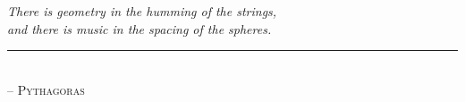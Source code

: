 \begin{flushleft}
	\textsl{There is geometry in the humming of the strings,}\\
	\textsl{and there is music in the spacing of the spheres.}\\
	\rule[0pt]{21em}{0.5pt}\\
	-- \textsc{Pythagoras}\\
	\vspace{2em}
\end{flushleft}

%
%
%
%
%
%
%
%
%
